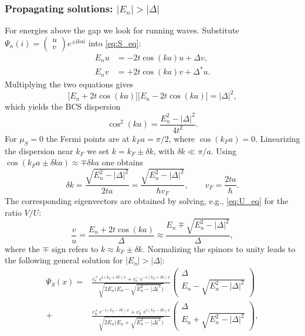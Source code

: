 \documentclass[11pt,a4paper,twoside,openany]{report}
\begin{document}
\subsubsection{Propagating solutions: $|E_n| > |\Delta|$}

For energies above the gap we look for running waves.  Substitute
$\Psi_n(i) = \begin{pmatrix} u \\ v \end{pmatrix} e^{\pm \mathrm{i} k a i}$ into \eqref{eq:S_eq}:
\begin{align}
  E_n u &= -2t\cos(k a) u + \Delta v, \label{eq:U_eq}\\
  E_n v &= +2t\cos(k a) v + \Delta^* u . \label{eq:V_eq}
\end{align}
Multiplying the two equations gives
\begin{equation}
  \bigl[E_n + 2t\cos(k a)\bigr]\bigl[E_n - 2t\cos(k a)\bigr] = |\Delta|^2,
\end{equation}
which yields the BCS dispersion
\begin{equation}
  \cos^2(k a) = \frac{E_n^2 - |\Delta|^2}{4 t^2}.
  \label{eq:cos2_S}
\end{equation}
For $\mu_S=0$ the Fermi points are at $k_F a = \pi/2$, where $\cos(k_F a)=0$. Linearizing the dispersion near $k_F$ we set $k = k_F \pm \delta k$, with $\delta k \ll \pi/a$.  Using $\cos(k_F a \pm \delta k a) \approx \mp \delta k a$ one obtains
\begin{equation}
  \delta k = \frac{\sqrt{E_n^2 - |\Delta|^2}}{2 t a}
           = \frac{\sqrt{E_n^2 - |\Delta|^2}}{\hbar v_F}, \qquad v_F = \frac{2ta}{\hbar}.
  \label{eq:delta_k_S}
\end{equation}
The corresponding eigenvectors are obtained by solving, e.g., \eqref{eq:U_eq} for the ratio $V/U$:
\begin{equation}
  \frac{v}{u} = \frac{E_n + 2t\cos(k a)}{\Delta}
               \approx \frac{E_n \mp \sqrt{E_n^2 - |\Delta|^2}}{\Delta},
\end{equation}
where the $\mp$ sign refers to $k \approx k_F \pm \delta k$.  Normalizing the spinors to unity leads to the following general solution for $|E_n|> |\Delta|$:
\begin{equation}
  \boxed{
  \begin{aligned}
  \Psi_S(x) = &
    \frac{c_e^+\, e^{\mathrm{i}(k_F+\delta k)x} + c_e^-\, e^{-\mathrm{i}(k_F+\delta k)x}}
         {\sqrt{2E_n\bigl(E_n-\sqrt{E_n^2-|\Delta|^2}\bigr)}}
    \begin{pmatrix} \Delta \\[2pt] E_n - \sqrt{E_n^2-|\Delta|^2} \end{pmatrix} \\[4pt]
  + & \frac{c_h^+\, e^{-\mathrm{i}(k_F-\delta k)x} + c_h^-\, e^{\mathrm{i}(k_F-\delta k)x}}
         {\sqrt{2E_n\bigl(E_n+\sqrt{E_n^2-|\Delta|^2}\bigr)}}
    \begin{pmatrix} \Delta \\[2pt] E_n + \sqrt{E_n^2-|\Delta|^2} \end{pmatrix},
  \end{aligned}}
  \label{eq:Psi_S_above}
\end{equation}
\end{document}

